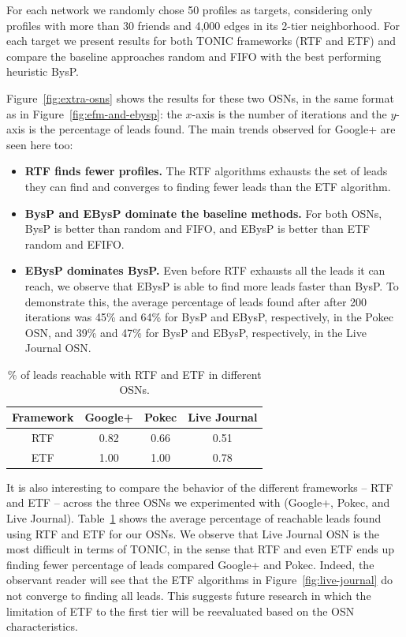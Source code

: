 \documentclass[journal]{IEEEtran}
\begin{document}
For each network we randomly chose 50 profiles as targets, considering only profiles with more than 30 friends and 4,000 edges in its 2-tier neighborhood. For each target we present results for both TONIC frameworks (RTF and ETF)
and compare the baseline approaches random and FIFO with the best performing heuristic BysP. 

Figure~\ref{fig:extra-osns} shows the results for these two OSNs, in the same format as in Figure~\ref{fig:efm-and-ebysp}: the $x$-axis is the number of iterations and the $y$-axis is the percentage of leads found. The main trends observed for Google+ are seen here too:
\begin{itemize}
\item {\bf RTF finds fewer profiles.} The RTF algorithms exhausts the set of leads they can find and converges to finding fewer leads than the ETF algorithm.
\item {\bf BysP and EBysP dominate the baseline methods.} For both OSNs, BysP is better than random and FIFO, and EBysP is better than ETF random and EFIFO. 
\item {\bf EBysP dominates BysP.} Even before RTF exhausts all the leads it can reach, we observe that EBysP is able to find more leads faster than BysP. To demonstrate this, the average percentage of leads found after after 200 iterations was 45\% and 64\% for BysP and EBysP, respectively, in the Pokec OSN, and 39\% and 47\% for BysP and EBysP, respectively, in the Live Journal OSN. 
\end{itemize}




\begin{table}
\centering
\begin{tabular}{|c|c|c|c|}
\hline
Framework & Google+ & Pokec & Live Journal \\ \hline
RTF & 0.82 & 0.66 & 0.51 \\ 
ETF & 1.00 & 1.00 & 0.78 \\
\hline
\end{tabular}
\caption{\% of leads reachable with RTF and ETF in different OSNs.}
\label{tab:tiers-other-osns}
\end{table}

It is also interesting to compare the behavior of the different frameworks -- RTF and ETF -- across the three OSNs we experimented with (Google+, Pokec, and Live Journal). Table~\ref{tab:tiers-other-osns} shows the average percentage of reachable leads found using RTF and ETF for our OSNs. We observe that Live Journal OSN is the most difficult in terms of TONIC, in the sense that RTF and even ETF ends up finding fewer percentage of leads compared Google+ and Pokec. Indeed, the observant reader will see that the ETF algorithms in Figure~\ref{fig:live-journal} do not converge to finding all leads. This suggests future research in which the limitation of ETF to the first tier will be reevaluated based on the OSN characteristics. 
\end{document}
